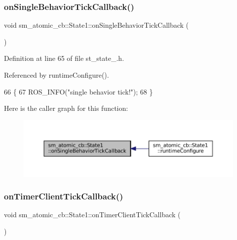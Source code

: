 \subsubsection{\texorpdfstring{on\+Single\+Behavior\+Tick\+Callback()}{onSingleBehaviorTickCallback()}}
{\footnotesize\ttfamily void sm\+\_\+atomic\+\_\+cb\+::\+State1\+::on\+Single\+Behavior\+Tick\+Callback (\begin{DoxyParamCaption}{ }\end{DoxyParamCaption})\hspace{0.3cm}{\ttfamily [inline]}}



Definition at line 65 of file st\+\_\+state\+\_.\+h.



Referenced by runtime\+Configure().


\begin{DoxyCode}
66     \{
67         ROS\_INFO(\textcolor{stringliteral}{"single behavior tick!"});
68     \}
\end{DoxyCode}
Here is the caller graph for this function\+:
\nopagebreak
\begin{figure}[H]
\begin{center}
\leavevmode
\includegraphics[width=350pt]{structsm__atomic__cb_1_1State1_a5c34a516ff618f865f668d7db05b2cb8_icgraph}
\end{center}
\end{figure}
\mbox{\label{structsm__atomic__cb_1_1State1_a1e1f3cc8c74bc13e28ce47f133c2cecb}} 
\subsubsection{\texorpdfstring{on\+Timer\+Client\+Tick\+Callback()}{onTimerClientTickCallback()}}
{\footnotesize\ttfamily void sm\+\_\+atomic\+\_\+cb\+::\+State1\+::on\+Timer\+Client\+Tick\+Callback (\begin{DoxyParamCaption}{ }\end{DoxyParamCaption})\hspace{0.3cm}{\ttfamily [inline]}}



